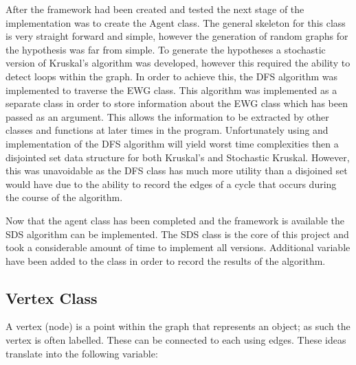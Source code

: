 \documentclass{AISB2008}
\begin{document}
After the framework had been created and tested the next stage of the implementation was to create the Agent class. The general skeleton for this class is very straight forward and simple, however the generation of random graphs for the hypothesis was far from simple. To generate the hypotheses a stochastic version of Kruskal’s algorithm was developed, however this required the ability to detect loops within the graph. In order to achieve this, the DFS algorithm was implemented to traverse the EWG class. This algorithm was implemented as a separate class in order to store information about the EWG class which has been passed as an argument. This allows the information to be extracted by other classes and functions at later times in the program. Unfortunately using and implementation of the DFS algorithm will yield worst time complexities then a disjointed set data structure for both Kruskal’s and Stochastic Kruskal. However, this was unavoidable as the DFS class has much more utility than a disjoined set would have due to the ability to record the edges of a cycle that occurs during the course of the algorithm.

Now that the agent class has been completed and the framework is available the SDS algorithm can be implemented. The SDS class is the core of this project and took a considerable amount of time to implement all versions.  Additional variable have been added to the class in order to record the results of the algorithm.


\subsection{Vertex Class}

A vertex (node) is a point within the graph that represents an object; as such the vertex is often labelled. These can be connected to each using edges. These ideas translate into the following variable:
\end{document}
